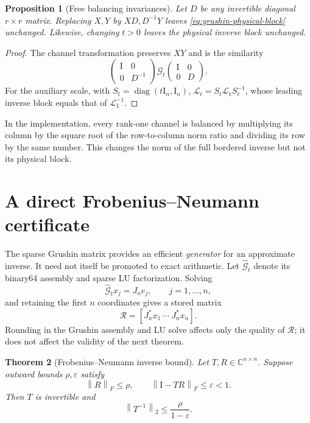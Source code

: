 \documentclass[11pt]{article}
\newtheorem{theorem}{Theorem}[section]
\newtheorem{proposition}[theorem]{Proposition}
\theoremstyle{definition}
\theoremstyle{remark}
\newcommand{\C}{\mathbb C}
\newcommand{\Id}{\mathrm I}
\newcommand{\norm}[1]{\left\lVert#1\right\rVert}
\newcommand{\Gmat}{\mathcal G}
\newcommand{\Lmat}{\mathcal L}
\newcommand{\Rapp}{\mathcal R}
\begin{document}
\begin{proposition}[Free balancing invariances]
\label{prop:balancing}
Let $D$ be any invertible diagonal $r\times r$ matrix.  Replacing
$X,Y$ by $XD,D^{-1}Y$ leaves \cref{eq:grushin-physical-block} unchanged.
Likewise, changing $t>0$ leaves the physical inverse block unchanged.
\end{proposition}

\begin{proof}
The channel transformation preserves $XY$ and is the similarity
\[
 \begin{pmatrix}\Id&0\\0&D^{-1}\end{pmatrix}
 \Gmat_t
 \begin{pmatrix}\Id&0\\0&D\end{pmatrix}.
\]
For the auxiliary scale, with $S_t=\operatorname{diag}(t\Id_n,\Id_n)$,
$\Lmat_t=S_t\Lmat_1S_t^{-1}$, whose leading inverse block equals that of
$\Lmat_1^{-1}$.
\end{proof}

In the implementation, every rank-one channel is balanced by multiplying its
column by the square root of the row-to-column norm ratio and dividing its
row by the same number.  This changes the norm of the full bordered inverse
but not its physical block.


\section{A direct Frobenius--Neumann certificate}
\label{sec:certificate}

The sparse Grushin matrix provides an efficient \emph{generator} for an
approximate inverse.  It need not itself be promoted to exact arithmetic.
Let $\widehat{\Gmat}_t$ denote its binary64 assembly and sparse LU
factorization.  Solving
\[
 \widehat{\Gmat}_t x_j=J_ne_j,
 \qquad j=1,\dots,n,
\]
and retaining the first $n$ coordinates gives a stored matrix
\begin{equation}
 \Rapp=[J_n^*x_1\ \cdots\ J_n^*x_n].
 \label{eq:approximate-right-inverse}
\end{equation}
Rounding in the Grushin assembly and LU solve affects only the quality of
$\Rapp$; it does not affect the validity of the next theorem.

\begin{theorem}[Frobenius--Neumann inverse bound]
\label{thm:frobenius-neumann}
Let $T,R\in\C^{n\times n}$.  Suppose outward bounds $\rho,\varepsilon$
satisfy
\begin{equation}
 \norm{R}_F\leq\rho,
 \qquad
 \norm{\Id-TR}_F\leq\varepsilon<1.
 \label{eq:neumann-inputs}
\end{equation}
Then $T$ is invertible and
\begin{equation}
 \norm{T^{-1}}_2
 \leq \frac{\rho}{1-\varepsilon}.
 \label{eq:frobenius-neumann}
\end{equation}
\end{theorem}
\end{document}
